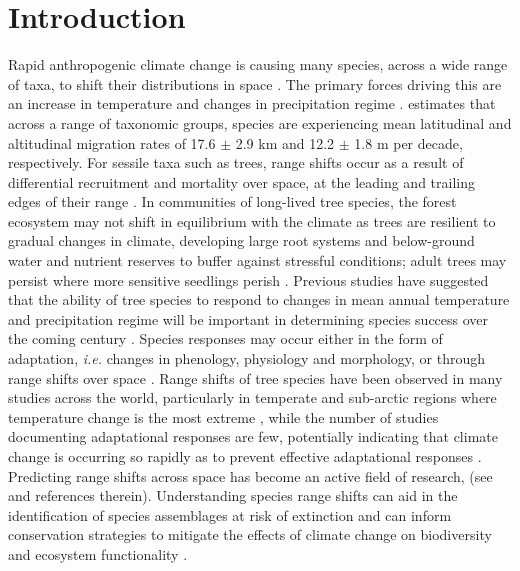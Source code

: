 \documentclass[a4paper,11pt]{article}
\begin{document}
\section{Introduction}
Rapid anthropogenic climate change is causing many species, across a wide range of taxa, to shift their distributions in space \citep{Hughes2000, Parmesan2006, Chen2011}. The primary forces driving this are an increase in temperature and changes in precipitation regime \citep{Corlett2013, McCain2011 }. \citet{Chen2011} estimates that across a range of taxonomic groups, species are experiencing mean latitudinal and altitudinal migration rates of 17.6 $\pm$ 2.9 km and 12.2 $\pm$ 1.8 m per decade, respectively. For sessile taxa such as trees, range shifts occur as a result of differential recruitment and mortality over space, at the leading and trailing edges of their range \citep{}. In communities of long-lived tree species, the forest ecosystem may not shift in equilibrium with the climate as trees are resilient to gradual changes in climate, developing large root systems and below-ground water and nutrient reserves to buffer against stressful conditions; adult trees may persist where more sensitive seedlings perish \citep{}. Previous studies have suggested that the ability of tree species to respond to changes in mean annual temperature and precipitation regime will be important in determining species success over the coming century \citep{Colwell2008, Chen2011, Feeley2012}. Species responses may occur either in the form of adaptation, \textit{i.e.} changes in phenology, physiology and morphology, or through range shifts over space \citep{Bellard2012}. Range shifts of tree species have been observed in many studies across the world, particularly in temperate and sub-arctic regions \citep{} where temperature change is the most extreme \citep{}, while the number of studies documenting adaptational responses are few, potentially indicating that climate change is occurring so rapidly as to prevent effective adaptational responses \citep{}. Predicting range shifts across space has become an active field of research, (see \citealt{Bellard2012} and references therein). Understanding species range shifts can aid in the identification of species assemblages at risk of extinction and can inform conservation strategies to mitigate the effects of climate change on biodiversity and ecosystem functionality \citep{}.
\end{document}

